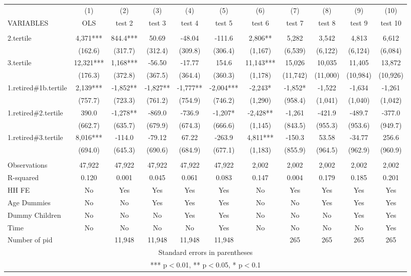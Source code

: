\begin{tabular}{lcccccccccc} \hline
 & (1) & (2) & (3) & (4) & (5) & (6) & (7) & (8) & (9) & (10) \\
VARIABLES & OLS & test 2 & test 3 & test 4 & test 5 & test 6 & test 7 & test 8 & test 9 & test 10 \\ \hline
 &  &  &  &  &  &  &  &  &  &  \\
2.tertile & 4,371*** & 844.4*** & 50.69 & -48.04 & -111.6 & 2,806** & 5,282 & 3,542 & 4,813 & 6,612 \\
 & (162.6) & (317.7) & (312.4) & (309.8) & (306.4) & (1,167) & (6,539) & (6,122) & (6,124) & (6,084) \\
3.tertile & 12,321*** & 1,168*** & -56.50 & -17.77 & 154.6 & 11,143*** & 15,026 & 10,035 & 11,405 & 13,872 \\
 & (176.3) & (372.8) & (367.5) & (364.4) & (360.3) & (1,178) & (11,742) & (11,000) & (10,984) & (10,926) \\
1.retired\#1b.tertile & 2,139*** & -1,852** & -1,827** & -1,777** & -2,004*** & -2,243* & -1,852* & -1,522 & -1,634 & -1,261 \\
 & (757.7) & (723.3) & (761.2) & (754.9) & (746.2) & (1,290) & (958.4) & (1,041) & (1,040) & (1,042) \\
1.retired\#2.tertile & 390.0 & -1,278** & -869.0 & -736.9 & -1,207* & -2,428** & -1,261 & -421.9 & -489.7 & -377.0 \\
 & (662.7) & (635.7) & (679.9) & (674.3) & (666.6) & (1,145) & (843.5) & (955.3) & (953.6) & (949.7) \\
1.retired\#3.tertile & 8,016*** & -114.0 & -79.12 & 67.22 & -263.9 & 4,811*** & -150.3 & 53.58 & -34.77 & 256.6 \\
 & (694.0) & (645.3) & (690.6) & (684.9) & (677.1) & (1,183) & (855.9) & (964.5) & (962.9) & (960.9) \\
 &  &  &  &  &  &  &  &  &  &  \\
Observations & 47,922 & 47,922 & 47,922 & 47,922 & 47,922 & 2,002 & 2,002 & 2,002 & 2,002 & 2,002 \\
R-squared & 0.120 & 0.001 & 0.045 & 0.061 & 0.083 & 0.147 & 0.004 & 0.179 & 0.185 & 0.201 \\
HH FE & No & Yes & Yes & Yes & Yes & No & Yes & Yes & Yes & Yes \\
Age Dummies & No & No & Yes & Yes & Yes & No & No & Yes & Yes & Yes \\
Dummy Children & No & No & No & Yes & Yes & No & No & No & Yes & Yes \\
Time & No & No & No & No & Yes & No & No & No & No & Yes \\
 Number of pid &  & 11,948 & 11,948 & 11,948 & 11,948 &  & 265 & 265 & 265 & 265 \\ \hline
\multicolumn{11}{c}{ Standard errors in parentheses} \\
\multicolumn{11}{c}{ *** p$<$0.01, ** p$<$0.05, * p$<$0.1} \\
\end{tabular}
